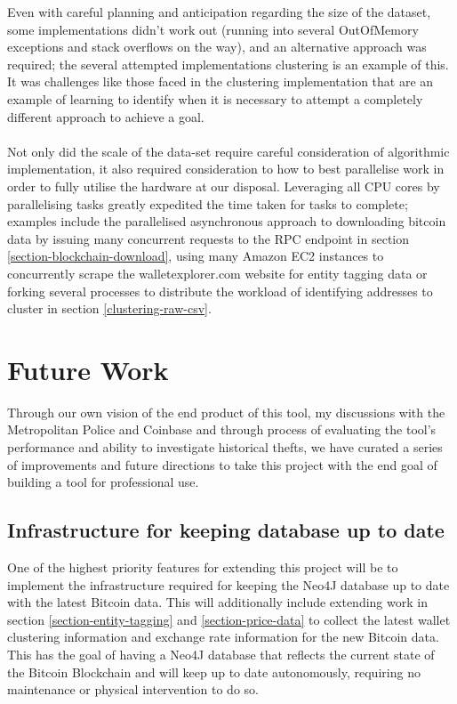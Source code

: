 Even with careful planning and anticipation regarding the size of the dataset, some implementations didn't work out (running into several OutOfMemory exceptions and stack overflows on the way), and an alternative approach was required; the several attempted implementations clustering is an example of this. It was challenges like those faced in the clustering implementation that are an example of learning to identify when it is necessary to attempt a completely different approach to achieve a goal. 
\\\\
Not only did the scale of the data-set require careful consideration of algorithmic implementation, it also required consideration to how to best parallelise work in order to fully utilise the hardware at our disposal. 
Leveraging all CPU cores by parallelising tasks greatly expedited the time taken for tasks to complete; examples include the parallelised asynchronous approach to downloading bitcoin data by issuing many concurrent requests to the RPC endpoint in section \ref{section-blockchain-download}, using many Amazon EC2 instances to concurrently scrape the walletexplorer.com website for entity tagging data or forking several processes to distribute the workload of identifying addresses to cluster in section \ref{clustering-raw-csv}.

\section{Future Work}
Through our own vision of the end product of this tool, my discussions with the Metropolitan Police and Coinbase and through process of evaluating the tool's performance and ability to investigate historical thefts, we have curated a series of improvements and future directions to take this project with the end goal of building a tool for professional use. 

\subsection{Infrastructure for keeping database up to date}
One of the highest priority features for extending this project will be to implement the infrastructure required for keeping the Neo4J database up to date with the latest Bitcoin data. This will additionally include extending work in section \ref{section-entity-tagging} and \ref{section-price-data} to collect the latest wallet clustering information and exchange rate information for the new Bitcoin data. This has the goal of having a Neo4J database that reflects the current state of the Bitcoin Blockchain and will keep up to date autonomously, requiring no maintenance or physical intervention to do so. 

